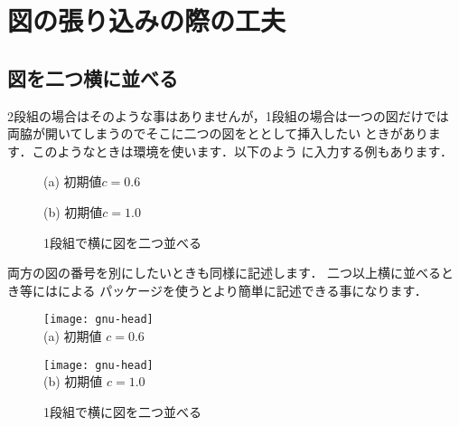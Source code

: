 \section{図の張り込みの際の工夫}


\subsection{図を二つ横に並べる}
2段組の場合はそのような事はありませんが，1段組の場合は一つの図だけでは
両脇が開いてしまうのでそこに二つの図をととして挿入したい
ときがあります．このようなときは環境を使います．以下のよう
に入力する例もあります．

%
\begin{intext}
\begin{figure}[htbp]
  \begin{minipage}{.47\textwidth}
      \centering%
      {\small (a) 初期値$c=0.6$}
  \end{minipage} \hfill
  \begin{minipage}{.47\textwidth}
      \centering%
      {\small (b) 初期値$c=1.0$}
  \end{minipage}
  \caption{1段組で横に図を二つ並べる}
\end{figure}
\end{intext}

両方の図の番号を別にしたいときも同様に記述します．
二つ以上横に並べるとき等にはによる
パッケージを使うとより簡単に記述できる事になります．

\begin{figure}[htbp]
  \begin{minipage}{.47\textwidth}
      \centering
      \texttt{[image: gnu-head]}\\
      {\small(a) 初期値 $c=0.6$}
  \end{minipage}
\hfill
  \begin{minipage}{.47\textwidth}
      \centering
      \texttt{[image: gnu-head]}\\
      {\small(b) 初期値 $c=1.0$}
  \end{minipage}
  \caption{1段組で横に図を二つ並べる}
\end{figure}


